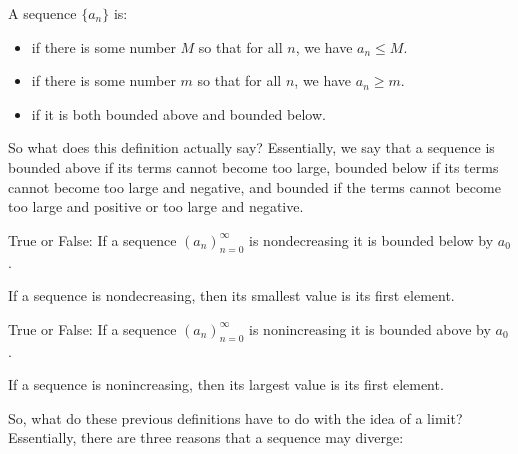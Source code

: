 \documentclass{ximera}
\begin{document}
\begin{definition}
  \label{definition:sequence-bounded}
  A sequence $\{a_n\}$ is:
  
  \begin{itemize}
  \item {} if there is some number $M$ so
  that for all $n$, we have $a_n\le M$.
    \item {} if there is some number $m$ so
  that for all $n$, we have $a_n\ge m$.
  \item {} if it is both bounded above and bounded below.
  \end{itemize}
\end{definition}

So what does this definition actually say? Essentially, we say that a sequence is bounded above if its terms cannot become too large, bounded below if its terms cannot become too large and negative, and bounded if the terms cannot become too large and positive or too large and negative.

\begin{question}
  True or False: If a sequence $(a_n)_{n=0}^\infty$ is nondecreasing
  it is bounded below by $a_0$.
  \begin{prompt}
    \begin{multipleChoice}
    \end{multipleChoice}
  \end{prompt}
  \begin{feedback}
    If a sequence is nondecreasing, then its smallest value is its
    first element.
  \end{feedback}
\end{question}


\begin{question}
  True or False: If a sequence $(a_n)_{n=0}^\infty$ is nonincreasing
  it is bounded above by $a_0$.
  \begin{prompt}
    \begin{multipleChoice}
    \end{multipleChoice}
  \end{prompt}
  \begin{feedback}
    If a sequence is nonincreasing, then its largest value is its
    first element.
  \end{feedback}
\end{question}

So, what do these previous definitions have to do with the idea of a limit?  Essentially, there are three reasons that a sequence may diverge:
\end{document}
